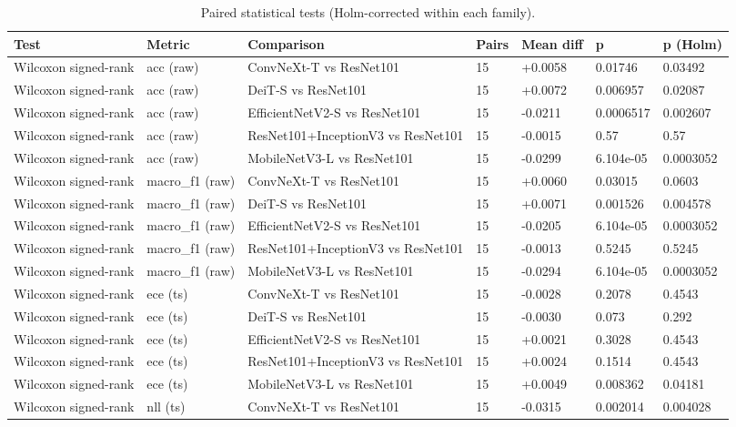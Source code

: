 \begin{table}[ht]
\centering
\small
\caption{Paired statistical tests (Holm-corrected within each family).}
\label{tab:tab8_statistical_tests}
\begin{tabular}{lllllll}
\hline
Test & Metric & Comparison & Pairs & Mean diff & p & p (Holm) \\
\hline
Wilcoxon signed-rank & acc (raw) & ConvNeXt-T vs ResNet101 & 15 & +0.0058 & 0.01746 & 0.03492 \\
Wilcoxon signed-rank & acc (raw) & DeiT-S vs ResNet101 & 15 & +0.0072 & 0.006957 & 0.02087 \\
Wilcoxon signed-rank & acc (raw) & EfficientNetV2-S vs ResNet101 & 15 & -0.0211 & 0.0006517 & 0.002607 \\
Wilcoxon signed-rank & acc (raw) & ResNet101+InceptionV3 vs ResNet101 & 15 & -0.0015 & 0.57 & 0.57 \\
Wilcoxon signed-rank & acc (raw) & MobileNetV3-L vs ResNet101 & 15 & -0.0299 & 6.104e-05 & 0.0003052 \\
Wilcoxon signed-rank & macro\_f1 (raw) & ConvNeXt-T vs ResNet101 & 15 & +0.0060 & 0.03015 & 0.0603 \\
Wilcoxon signed-rank & macro\_f1 (raw) & DeiT-S vs ResNet101 & 15 & +0.0071 & 0.001526 & 0.004578 \\
Wilcoxon signed-rank & macro\_f1 (raw) & EfficientNetV2-S vs ResNet101 & 15 & -0.0205 & 6.104e-05 & 0.0003052 \\
Wilcoxon signed-rank & macro\_f1 (raw) & ResNet101+InceptionV3 vs ResNet101 & 15 & -0.0013 & 0.5245 & 0.5245 \\
Wilcoxon signed-rank & macro\_f1 (raw) & MobileNetV3-L vs ResNet101 & 15 & -0.0294 & 6.104e-05 & 0.0003052 \\
Wilcoxon signed-rank & ece (ts) & ConvNeXt-T vs ResNet101 & 15 & -0.0028 & 0.2078 & 0.4543 \\
Wilcoxon signed-rank & ece (ts) & DeiT-S vs ResNet101 & 15 & -0.0030 & 0.073 & 0.292 \\
Wilcoxon signed-rank & ece (ts) & EfficientNetV2-S vs ResNet101 & 15 & +0.0021 & 0.3028 & 0.4543 \\
Wilcoxon signed-rank & ece (ts) & ResNet101+InceptionV3 vs ResNet101 & 15 & +0.0024 & 0.1514 & 0.4543 \\
Wilcoxon signed-rank & ece (ts) & MobileNetV3-L vs ResNet101 & 15 & +0.0049 & 0.008362 & 0.04181 \\
Wilcoxon signed-rank & nll (ts) & ConvNeXt-T vs ResNet101 & 15 & -0.0315 & 0.002014 & 0.004028 \\

\end{tabular}
\end{table}
